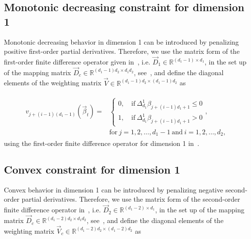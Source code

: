 \subsection{Monotonic decreasing constraint for dimension 1} \label{subsec:MDC-TP-one-dim}

Monotonic decreasing behavior in dimension 1 can be introduced by penalizing positive first-order partial derivatives. Therefore, we use the matrix form of the first-order finite difference operator given in~, i.e. $\vec{D}_1 \in \mathbb{R}^{(d_1-1) \times d_1}$, in the set up of the mapping matrix $\vec{D}_c \in \mathbb{R}^{(d_1-1)d_2 \times d_1d_2}$, see~, and define the diagonal elements of the weighting matrix $\vec{V} \in \mathbb{R}^{(d_1-1)d_2 \times (d_1-1)d_2}$ as

\begin{align} 
	\begin{split}
	v_{j+(i-1)(d_1-1)} (\vec{\beta}_t) ={}& \begin{cases}
		0, \quad \text{if} \ \Delta^1_{d_1} \beta_{j+(i-1)d_1 + 1} \le 0 \\ 
		1, \quad \text{if} \ \Delta^1_{d_1} \beta_{j+(i-1)d_1 + 1} > 0
	\end{cases},	\\ {}& \text{for} \ j=1,2,\dots,d_1-1 \ \text{and} \ i=1,2,\dots,d_2,
	\end{split}
\end{align}
%
using the first-order finite difference operator for dimension 1 in~.

\subsection{Convex constraint for dimension 1} \label{subsec:CONV-TP-one-dim}

Convex behavior in dimension 1 can be introduced by penalizing negative second-order partial derivatives. Therefore, we  use the matrix form of the second-order finite difference operator in~, i.e. $\vec{D}_2 \in \mathbb{R}^{(d_1-2) \times d_1}$, in the set up of the mapping matrix $\vec{D}_c \in \mathbb{R}^{(d_1-2)d_2 \times d_1d_2}$, see~, and define the diagonal elements of the weighting matrix $\vec{V}_c \in \mathbb{R}^{(d_1-2)d_2 \times (d_1-2)d_2}$ as

